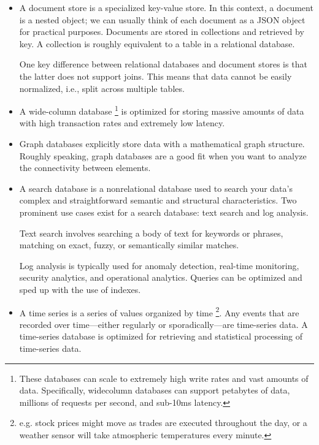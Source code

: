 \begin{enumerate}
\begin{itemize}
        \item A document store is a specialized key-value store.
        In this context, a document is a nested object; we can
        usually think of each document as a JSON object for
        practical purposes. Documents are stored in collections
        and retrieved by key. A collection is roughly equivalent
        to a table in a relational database.

        One key difference between relational databases and
        document stores is that the latter does not support joins.
        This means that data cannot be easily normalized, i.e.,
        split across multiple tables.

        \item A wide-column database 
        \footnote{
            These databases can scale to extremely high write
            rates and vast amounts of data. Specifically,
            widecolumn databases can support petabytes of data,
            millions of requests per second, and sub-10ms latency.
        }
        is optimized for storing massive amounts of data with
        high transaction rates and extremely low latency. 

        \item Graph databases explicitly store data with a
        mathematical graph structure. Roughly speaking, graph
        databases are a good fit when you want to analyze the
        connectivity between elements.

        \item A search database is a nonrelational database
        used to search your data's complex and straightforward
        semantic and structural characteristics. Two prominent
        use cases exist for a search database: text search and
        log analysis.

        Text search involves searching a body of text for keywords
        or phrases, matching on exact, fuzzy, or semantically
        similar matches.
        
        Log analysis is typically used for anomaly detection,
        real-time monitoring, security analytics, and operational
        analytics. Queries can be optimized and sped up with the
        use of indexes.

        \item A time series is a series of values organized by
        time
        \footnote{
            e.g. stock prices might move as trades are executed
            throughout the day, or a weather sensor will take
            atmospheric temperatures every minute.
        }. 
        Any events that are recorded over time—either regularly
        or sporadically—are time-series data. A time-series
        database is optimized for retrieving and statistical
        processing of time-series data.


\end{itemize}
\end{enumerate}
